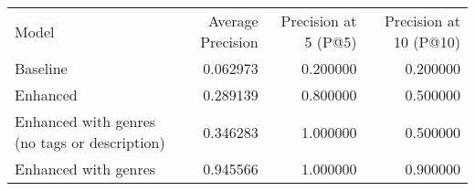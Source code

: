 \begin{tabular}{lrrr}
Model & Average Precision & Precision at 5 (P@5) & Precision at 10 (P@10) \\
Baseline & 0.062973 & 0.200000 & 0.200000 \\
Enhanced & 0.289139 & 0.800000 & 0.500000 \\
Enhanced with genres (no tags or description) & 0.346283 & 1.000000 & 0.500000 \\
Enhanced with genres & 0.945566 & 1.000000 & 0.900000 \\
\end{tabular}
